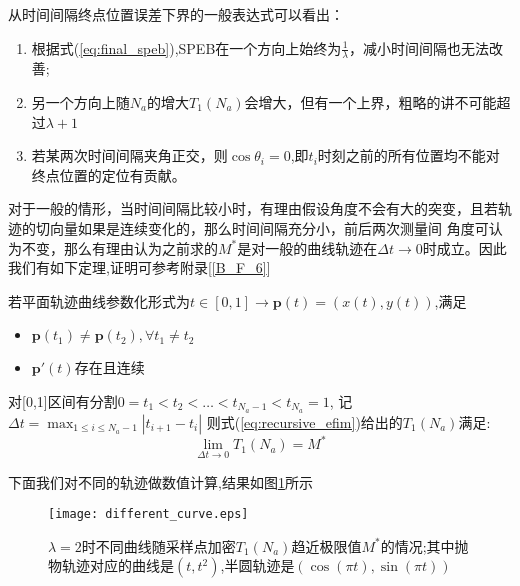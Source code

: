 从时间间隔终点位置误差下界的一般表达式可以看出：
\begin{enumerate}
  \item 根据式(\ref{eq:final_speb}),SPEB在一个方向上始终为$\frac{1}{\lambda}$，减小时间间隔也无法改善;
  \item 另一个方向上随$N_a$的增大$T_1(N_a)$会增大，但有一个上界，粗略的讲不可能超过$\lambda+1$
  \item 若某两次时间间隔夹角正交，则$\cos\theta_i=0$,即$t_i$时刻之前的所有位置均不能对终点位置的定位有贡献。
\end{enumerate}
对于一般的情形，当时间间隔比较小时，有理由假设角度不会有大的突变，且若轨迹的切向量如果是连续变化的，那么时间间隔充分小，前后两次测量间
角度可认为不变，那么有理由认为之前求的$M^*$是对一般的曲线轨迹在$\Delta t\to 0$时成立。因此我们有如下定理,证明可参考附录[\ref{B_F_6}]
\begin{theorem}\label{theorem:arbitrary_curve}
若平面轨迹曲线参数化形式为$t\in[0,1]\rightarrow \bm{p}(t)=(x(t),y(t))$,满足
\begin{itemize}
\item $\bm{p}(t_1)\neq \bm{p}(t_2),\forall t_1\neq t_2$
\item $\bm{p}'(t)$存在且连续
\end{itemize}
对[0,1]区间有分割$0=t_1<t_2<\dots<t_{N_a-1}<t_{N_a}=1$,
记$\Delta t=\max_{1\leq i\leq N_a-1}|t_{i+1}-t_i|$
则式(\ref{eq:recursive_efim})给出的$T_1(N_a)$满足:
\begin{equation}\label{eq:limiting_cf}
\lim_{\Delta t\to 0}T_1(N_a)=M^*
\end{equation}
\end{theorem}

下面我们对不同的轨迹做数值计算,结果如图\ref{figure:tend_to_limit}所示
\begin{figure}
  \centering
  \texttt{[image: different\_curve.eps]}
  \caption{$\lambda=2$时不同曲线随采样点加密$T_1(N_a)$趋近极限值$M^*$的情况;其中抛物轨迹对应的曲线是$(t,t^2)$,半圆轨迹是$(\cos(\pi t),\sin(\pi t))$}\label{figure:tend_to_limit}
\end{figure}

